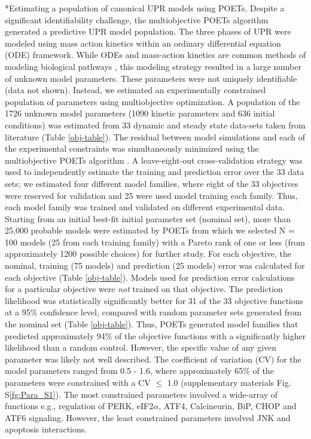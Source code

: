 \documentclass[12pt]{article}
\makeatletter
\renewcommand\subsection{\@startsection
	{subsection}{2}{0mm}
	{-0.05in}
	{-0.5\baselineskip}
	{\normalfont\normalsize\bfseries}}
\makeatother
\begin{document}
\subsection*{Estimating a population of canonical UPR models using POETs.}
Despite a significant identifiability challenge, the multiobjective POETs algorithm generated a predictive UPR model population. The three phases of UPR were modeled using mass action kinetics within an ordinary differential equation (ODE) framework. While ODEs and mass-action kinetics are common methods of modeling biological pathways \cite{Schoeberl:2002rv, Chen:2009uq, Helmy:2009kx}, this modeling strategy resulted in a large number of unknown model parameters. These parameters were not uniquely identifiable (data not shown). Instead, we estimated an experimentally constrained population of parameters using multiobjective optimization. A population of the 1726 unknown model parameters (1090 kinetic parameters and 636 initial conditions) was estimated from 33 dynamic and steady state data-sets taken from literature (Table \ref{obj-table}). The residual between model simulations and each of the experimental constraints was simultaneously minimized using the multiobjective POETs algorithm \cite{Song:2010ij}. A leave-eight-out cross-validation strategy was used to independently estimate the training and prediction error over the 33 data sets; we estimated four different model families, where eight of the 33 objectives were reserved for validation and 25 were used model training each family. Thus, each model family was trained and validated on different experimental data. Starting from an initial best-fit initial parameter set (nominal set), more than 25,000 probable models were estimated by POETs from which we selected N = 100 models (25 from each training family) with a Pareto rank of one or less (from approximately 1200 possible choices) for further study. For each objective, the nominal, training (75 models) and prediction (25 models) error was calculated for each objective (Table \ref{obj-table}). Models used for prediction error calculations for a particular objective were \emph{not} trained on that objective. The prediction likelihood was statistically significantly better for 31 of the 33 objective functions at a 95\% confidence level, compared with random parameter sets generated from the nominal set (Table \ref{obj-table}). Thus, POETs generated model families that predicted approximately 94\% of the objective functions with a significantly higher likelihood than a random control. However, the specific value of any given parameter was likely not well described. The coefficient of variation (CV) for the model parameters ranged from 0.5 - 1.6, where approximately 65\% of the parameters were constrained with a CV $\leq$ 1.0 (supplementary materials Fig. S\ref{fg:Para_S1}). The most constrained parameters involved a wide-array of functions e.g., regulation of PERK, eIF2$\alpha$, ATF4, Calcineurin, BiP, CHOP and ATF6 signaling. However, the least constrained parameters involved JNK and apoptosis interactions.
\end{document}
